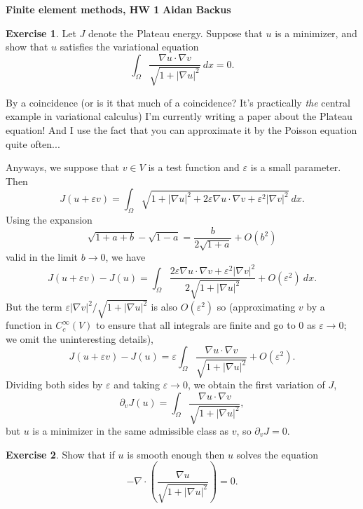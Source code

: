 \documentclass[10pt]{article}
\theoremstyle{definition}
\newtheorem{exer}{Exercise}
\begin{document}
\noindent
\large\textbf{Finite element methods, HW 1} \hfill \textbf{Aidan Backus} \\

\begin{exer}
    Let $J$ denote the Plateau energy. Suppose that $u$ is a minimizer, and show that $u$ satisfies the variational equation 
\begin{equation}\label{Variational}
    \int_\Omega \frac{\nabla u \cdot \nabla v}{\sqrt{1 + |\nabla u|^2}} ~dx = 0.
\end{equation}
\end{exer}

By a coincidence (or is it that much of a coincidence? It's practically \emph{the} central example in variational calculus) I'm currently writing a paper about the Plateau equation!
And I use the fact that you can approximate it by the Poisson equation quite often...

Anyways, we suppose that $v \in V$ is a test function and $\varepsilon$ is a small parameter. Then
$$J(u + \varepsilon v) = \int_\Omega \sqrt{1 + |\nabla u|^2 + 2\varepsilon \nabla u \cdot \nabla v + \varepsilon^2 |\nabla v|^2} ~dx.$$
Using the expansion 
\begin{equation}\label{Taylor sqrt}
    \sqrt{1 + a + b} - \sqrt{1 - a} = \frac{b}{2\sqrt{1 + a}} + O(b^2)
\end{equation}
valid in the limit $b \to 0$, we have 
$$J(u + \varepsilon v) - J(u) = \int_\Omega \frac{2\varepsilon \nabla u \cdot \nabla v + \varepsilon^2 |\nabla v|^2}{2\sqrt{1 + |\nabla u|^2}} + O(\varepsilon^2) ~dx.$$
But the term $\varepsilon |\nabla v|^2/\sqrt{1 + |\nabla u|^2}$ is also $O(\varepsilon^2)$ so (approximating $v$ by a function in $C^\infty_c(V)$ to ensure that all integrals are finite and go to $0$ as $\varepsilon \to 0$; we omit the uninteresting details),
$$J(u + \varepsilon v) - J(u) = \varepsilon \int_\Omega \frac{\nabla u \cdot \nabla v}{\sqrt{1 + |\nabla u|^2}} + O(\varepsilon^2).$$
Dividing both sides by $\varepsilon$ and taking $\varepsilon \to 0$, we obtain the first variation of $J$,
$$\partial_v J(u) = \int_\Omega \frac{\nabla u \cdot \nabla v}{\sqrt{1 + |\nabla u|^2}},$$
but $u$ is a minimizer in the same admissible class as $v$, so $\partial_v J = 0$.

\begin{exer}
    Show that if $u$ is smooth enough then $u$ solves the equation 
\begin{equation}\label{MSE}
    -\nabla \cdot \left(\frac{\nabla u}{\sqrt{1 + |\nabla u|^2}}\right) = 0.
\end{equation}
\end{exer}
\end{document}
